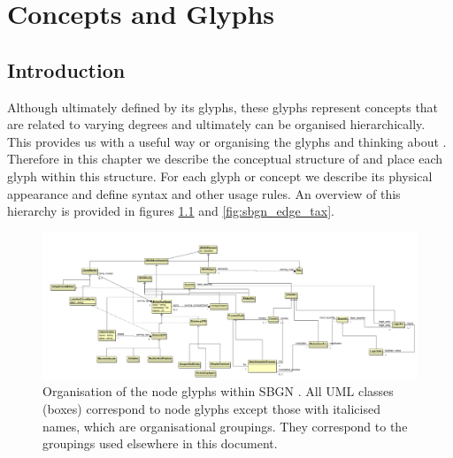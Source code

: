 
\chapter{Concepts and Glyphs}
\label{chp:glyphs}


\section{Introduction}

Although ultimately defined by its glyphs, \SBGNPDLone these glyphs
represent concepts that are related to varying degrees and ultimately
can be organised hierarchically. This provides us with a useful way or
organising the glyphs and thinking about \PD{}.  Therefore in this
chapter we describe the conceptual structure of \SBGNPDLone and place
each glyph within this structure. For each glyph or concept we describe its
physical appearance and define syntax and other usage rules. An
overview of this hierarchy is provided in figures
\ref{fig:sbgn_node_tax} and \ref{fig:sbgn_edge_tax}.

\begin{figure}[htb]
\begin{center}
\includegraphics[width=1.0\linewidth]{images/sbgnumloverview}
\caption{Organisation of the node glyphs within SBGN \PDl. All UML classes (boxes) correspond to \PD node glyphs except those with italicised names, which are organisational groupings. They correspond to the groupings used elsewhere in this document.}
\label{fig:sbgn_node_tax}
\end{center}
\end{figure}



